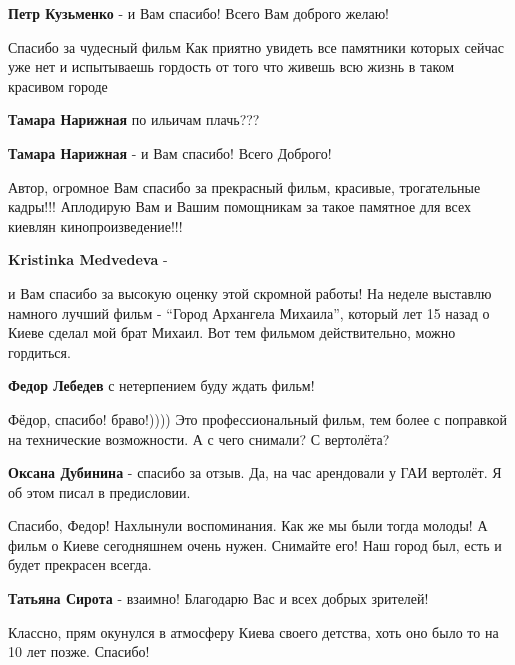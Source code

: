 \begin{itemize}
\textbf{Петр Кузьменко} - и Вам спасибо! Всего Вам доброго желаю!


Спасибо за чудесный фильм Как приятно увидеть все памятники которых сейчас уже
нет и испытываешь гордость от того что живешь всю жизнь в таком красивом городе

\begin{itemize} %
\textbf{Тамара Нарижная} по ильичам плачь???

\textbf{Тамара Нарижная} - и Вам спасибо! Всего Доброго!

\end{itemize} %


Автор, огромное Вам спасибо за прекрасный фильм, красивые, трогательные кадры!!!
Аплодирую Вам и Вашим помощникам за такое памятное для всех киевлян
кинопроизведение!!!

\begin{itemize} %
\textbf{Kristinka Medvedeva} - 

и Вам спасибо за высокую оценку этой скромной работы! На неделе выставлю
намного лучший фильм - \enquote{Город Архангела Михаила}, который лет 15 назад о Киеве
сделал мой брат Михаил. Вот тем фильмом действительно, можно гордиться.

\textbf{Федор Лебедев} с нетерпением буду ждать фильм!
\end{itemize} %

Фёдор, спасибо! браво!)))) Это профессиональный фильм, тем более с поправкой на
технические возможности. А с чего снимали? С вертолёта?

\textbf{Оксана Дубинина} - спасибо за отзыв. Да, на час арендовали у ГАИ вертолёт. Я об этом писал в предисловии.


Спасибо, Федор!
Нахлынули воспоминания.
Как же мы были тогда молоды!
А фильм о Киеве сегодняшнем очень нужен. Снимайте его!
Наш город был, есть и будет прекрасен всегда.

\textbf{Татьяна Сирота} - взаимно! Благодарю Вас и всех добрых зрителей!

Классно, прям окунулся в атмосферу Киева своего детства, хоть оно было то на 10 лет позже.
Спасибо!


\end{itemize}
